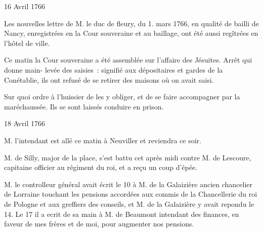                      
                     \begin{diary}{16 Avril 1766}{}
                        
                         Les nouvelles lettre de M. le duc de fleury,
                           du 1. mars
                              1766, en qualité de bailli de
                           Nancy, enregistrées en la Cour souveraine et au
                           baillage, ont été aussi
                           regîtrées en l'hôtel
                              de ville.
                        \bigskip
        
        
                         Ce matin la Cour souveraine a été assemblée sur
                           l'affaire des Jésuites. Arrêt qui donne main-
                              levée des saisies : signifié aux dépositaires
                           et gardes de la Conétablie, ils ont refusé de
                           se retirer des maisons où on avait saisi. \bigskip
        
        
                         Sur quoi ordre à l'huissier de les
                           y obliger,
                           et de se faire accompagner par la maréchaussée.
                           Ils se sont laissés conduire en prison. \bigskip
        
        
                     \end{diary}

                     \begin{diary}{18 Avril 1766}{}
                        
                        
                           M. l'intendant est allé ce matin
                           à Neuviller
                           et reviendra ce soir. \bigskip
        
        
                        
                           M. de Silly, major de la place, s'est
                           battu
                           cet après midi contre M. de
                              Lescoure, capitaine
                           officier au régiment du roi, et a reçu un coup
                           d'épée. \bigskip
        
        
                        
                           M. le controlleur
                              général avait écrit le
                              10
                           à M. de la Galaizière ancien chancelier de Lorraine
                           touchant les pensions accordées aux commis
                           de la Chancellerie du roi de Pologne et aux greffiers
                           des conseils, et M. de la Galaizière y avait repondu
                           le 14. Le
                              17 il a ecrit de sa main à
                           M. de Beaumont intendant des
                           finances, en faveur de
                              mes frères
                           et de moi, pour
                           augmenter nos pensions. \bigskip
        
        
                     \end{diary}

